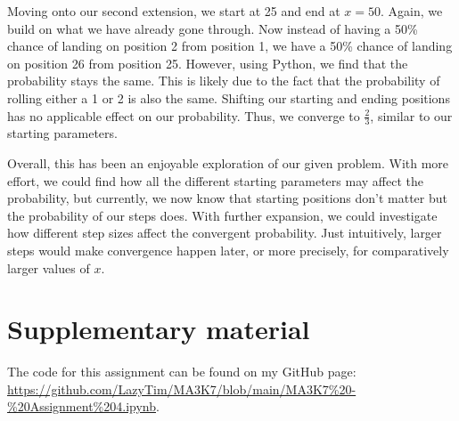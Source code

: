 \documentclass[11pt]{article}
\newcommand{\keywordfont}{\textsc}
\newcommand{\keyword}[1]{%
  \marginpar{\raggedright\small\keywordfont{#1}}}
\begin{document}
Moving onto our second extension, \keyword{Extend} we start at 25 and end at $x=50$. Again, we build on what we have already gone through. Now instead of having a 50\% chance of landing on position 2 from position 1, we have a 50\% chance of landing on position 26 from position 25. However, using Python,  \keyword{Try} we find that the probability stays the same. This is likely due to the fact that the probability of rolling either a 1 or 2 is also the same. Shifting our starting and ending positions has no applicable effect on our probability. Thus, we converge to $\frac{2}{3}$, similar to our starting parameters. 

Overall, \keyword{Reflect} this has been an enjoyable exploration of our given problem. With more effort, we could find how all the different starting parameters may affect the probability, but currently, we now know that starting positions don't matter but the probability of our steps does. With further expansion, we could investigate how different step sizes affect the convergent probability. Just intuitively, larger steps would make convergence happen later, or more precisely, for comparatively larger values of $x$.

\section*{Supplementary material}
The code for this assignment can be found on my GitHub page:  \url{https://github.com/LazyTim/MA3K7/blob/main/MA3K7%20-%20Assignment%204.ipynb}.
\end{document}
